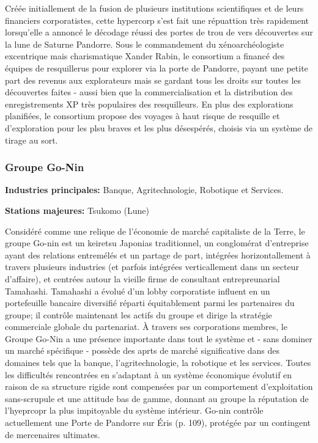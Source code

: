 Créée initiallement de la fusion de plusieurs institutions scientifiques et de leurs financiers corporatistes, cette hypercorp s'est fait une répuattion très rapidement lorsqu'elle a annoncé le décodage réussi des portes de trou de vers découvertes sur la lune de Saturne Pandorre. Sous le commandement du xénoarchéologiste excentrique mais charismatique Xander Rabin, le consortium a financé des équipes de resquillerus pour explorer via la porte de Pandorre, payant une petite part des revenus aux explorateurs mais se gardant tous les droits sur toutes les découvertes faites - aussi bien que la commercialisation et la distribution des enregistrements XP très populaires des resquilleurs. En plus des explorations planifiées, le consortium propose des voyages à haut risque de resquille et d'exploration pour les plsu braves et les plus désespérés, choisis via un système de tirage au sort. 

\subsubsection{Groupe Go-Nin} \label{sec:go-nin-group} 

\textbf{Industries principales:} Banque, Agritechnologie, Robotique et Services. 

\textbf{Stations majeures:} Tsukomo (Lune) 

Considéré comme une relique de l'économie de marché capitaliste de la Terre, le groupe Go-nin est un keiretsu Japonias traditionnel, un conglomérat d'entreprise ayant des relations entremélés et un partage de part, intégrées horizontallement à travers plusieurs industries (et parfois intégrées verticallement dans un secteur d'affaire), et centrées autour la vieille firme de consultant entrepreunarial Tamahashi. Tamahashi a évolué d'un lobby corporatiste influent en un portefeuille bancaire diversifié réparti équitablement parmi les partenaires du groupe; il contrôle maintenant les actifs du groupe et dirige la stratégie commerciale globale du partenariat. À travers ses corporations membres, le Groupe Go-Nin a une présence importante dans tout le système et - sans dominer un marché spécifique - possède des aprts de marché significative dans des domaines tels que la banque, l'agritechnologie, la robotique et les services. Toutes les difficultés rencontrées en s'adaptant à un système économique évolutif en raison de sa structure rigide sont compensées par un comportement d'exploitation sans-scrupule et une attitude bas de gamme, donnant au groupe la réputation de l'hyeprcopr la plus impitoyable du système intérieur. Go-nin contrôle actuellement une Porte de Pandorre sur Éris (p. 109), protégée par un contingent de mercenaires ultimates. 

